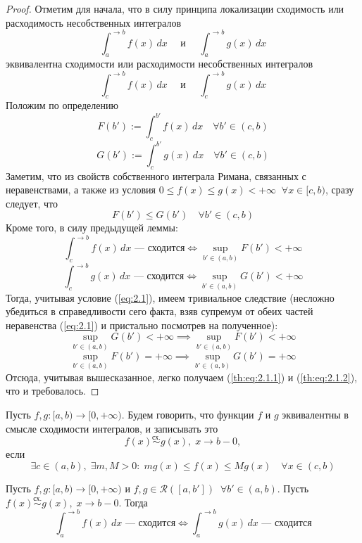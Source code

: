 \documentclass[11pt]{article}
\begin{document}
\begin{proof}
    Отметим для начала, что в силу принципа локализации сходимость или расходимость несобственных интегралов 
    \[\int_{a}^{\to b} f(x) \, dx \quad \text{ и } \quad \int_{a}^{\to b} g(x) \, dx\]
    эквивалентна сходимости или расходимости несобственных интегралов
    \[\int_{c}^{\to b} f(x) \, dx \quad \text{ и } \quad \int_{c}^{\to b} g(x) \, dx\]
    Положим по определению
    \[F(b') := \int_{c}^{b'} f(x) \, dx \quad \forall b' \in (c, b)\]
    \[G(b') := \int_{c}^{b'} g(x) \, dx \quad \forall b' \in (c, b)\]
    Заметим, что из свойств собственного интеграла Римана, связанных с неравенствами, а также из условия $0 \leq f(x) \leq g(x) < + \infty \; \; \forall x \in [c, b)$, сразу следует, что 
    \begin{equation*} \label{eq:2.1} \tag{$\star \star$}
        F(b') \leq G(b') \quad \forall b' \in (c, b)
    \end{equation*}
    Кроме того, в силу предыдущей леммы: 
    \[\int_{c}^{\to b} f(x) \, dx \text{ --- сходится} \iff \sup_{b' \in (a, b)} F(b') < + \infty\]
    \[\int_{c}^{\to b} g(x) \, dx \text{ --- сходится} \iff \sup_{b' \in (a, b)} G(b') < + \infty\]
    Тогда, учитывая условие (\ref{eq:2.1}), имеем тривиальное следствие (несложно убедиться в справедливости сего факта, взяв супремум от обеих частей неравенства (\ref{eq:2.1}) и пристально посмотрев на полученное):
    \[\sup_{b' \in (a, b)} G(b') < + \infty \implies \sup_{b' \in (a, b)} F(b') < + \infty\]
    \[\sup_{b' \in (a, b)} F(b') = + \infty \implies \sup_{b' \in (a, b)} G(b') = + \infty\]
    Отсюда, учитывая вышесказанное, легко получаем (\ref{th:eq:2.1.1}) и (\ref{th:eq:2.1.2}), что и требовалось.
\end{proof}

\begin{definition}
    Пусть $f, g \colon [a, b) \to [0, + \infty)$. Будем говорить, что функции $f$ и $g$ эквивалентны в смысле сходимости интегралов, и записывать это 
    \[f(x) \overset{\text{сх.}}{\sim} g(x), \; x \to b - 0,\]
    если
    \[\exists c \in (a, b),\; \exists m, M > 0: \; m g(x) \leq f(x) \leq M g(x) \quad \forall x \in (c, b)\]
\end{definition}

\begin{theorem}
    Пусть $f, g \colon [a, b) \to [0, + \infty)$ и $f, g \in \mathcal{R}([a, b']) \; \; \forall b' \in (a, b)$.
    Пусть $f(x) \overset{\text{сх.}}{\sim} g(x), \; x \to b - 0$. Тогда 
    \[\int_{a}^{\to b} f(x) \, dx \text{ --- сходится} \iff \int_{a}^{\to b} g(x) \, dx \text{ --- сходится}\]
\end{theorem}
\end{document}
